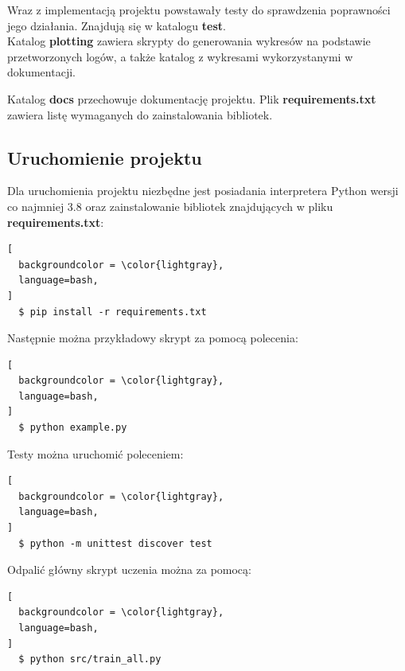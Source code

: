 \documentclass[12pt,a4paper]{article}
\begin{document}
Wraz z implementacją projektu powstawały testy do sprawdzenia poprawności
jego działania. Znajdują się w katalogu \textbf{test}. \\

Katalog \textbf{plotting} zawiera skrypty do generowania wykresów na
podstawie przetworzonych logów, a także katalog z wykresami wykorzystanymi
w dokumentacji.

Katalog \textbf{docs} przechowuje dokumentację projektu.
Plik \textbf{requirements.txt} zawiera listę wymaganych do zainstalowania
bibliotek.

\subsection{Uruchomienie projektu}

Dla uruchomienia projektu niezbędne jest posiadania interpretera Python wersji co najmniej 3.8
oraz zainstalowanie bibliotek znajdujących w pliku \textbf{requirements.txt}:

\begin{lstlisting}[
  backgroundcolor = \color{lightgray},
  language=bash,
]
  $ pip install -r requirements.txt
\end{lstlisting}

\bigskip

Następnie można przykładowy skrypt za pomocą polecenia:

\begin{lstlisting}[
  backgroundcolor = \color{lightgray},
  language=bash,
]
  $ python example.py
\end{lstlisting}

Testy można uruchomić poleceniem:

\begin{lstlisting}[
  backgroundcolor = \color{lightgray},
  language=bash,
]
  $ python -m unittest discover test
\end{lstlisting}

Odpalić główny skrypt uczenia można za pomocą:

\begin{lstlisting}[
  backgroundcolor = \color{lightgray},
  language=bash,
]
  $ python src/train_all.py
\end{lstlisting}
\end{document}
